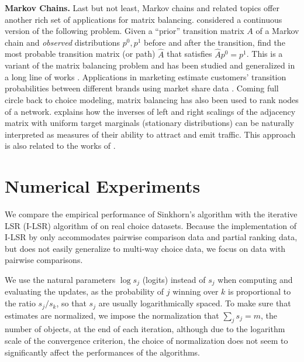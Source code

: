 \textbf{Markov Chains.}
Last but not least, Markov chains and related topics offer another rich set of applications for matrix balancing. \citet{schro1931uber} considered a continuous version of the following problem. Given a ``prior'' transition matrix $A$ of a Markov chain and \emph{observed} distributions $p^0,p^1$ before and after the transition, find the most probable transition matrix (or path) $\hat A$ that satisfies $\hat A p^0=p^1$. This is a variant of the matrix balancing problem and has been studied and generalized in a long line of works \citep{fortet1940resolution,beurling1960automorphism,ruschendorf1995convergence,gurvits2004classical,georgiou2015positive,friedland2017schrodinger}. Applications in marketing estimate customers' transition probabilities between different brands using market share data
\citep{theil1966quadratic}. Coming full circle back to  choice modeling, matrix balancing has also been used to rank nodes of a network. \citet{knight2008sinkhorn} explains how the inverses of left and right scalings of the adjacency matrix with uniform target marginals (stationary distributions) can be naturally interpreted as measures of their ability to attract and emit traffic. This approach is also related to the works of \citet{lamond1981bregman,kleinberg1999authoritative,tomlin2003new}.


\section{Numerical Experiments}
\label{sec:empirics}
We compare the empirical performance of Sinkhorn's algorithm with the iterative LSR (I-LSR) algorithm of \citet{maystre2015fast} on real choice datasets. Because the implementation of I-LSR by \citet{maystre2015fast}
only accommodates pairwise comparison data and partial ranking data, but does not easily generalize to multi-way choice data, we focus on data with pairwise comparisons. 

We use the
natural parameters $\log s_{j}$ (logits) instead of $s_{j}$ when computing and evaluating
the updates, as the probability of $j$ winning
over $k$ is proportional to the ratio $s_{j}/s_{k}$, so that $s_j$ are usually logarithmically spaced. To make sure that estimates
are normalized, we impose the normalization that $\sum_{j}s_{j}=m$,
the number of objects, at the end of each iteration, although due to
the logarithm scale of the convergence criterion, the choice of normalization
does not seem to significantly affect the performances of the algorithms.

